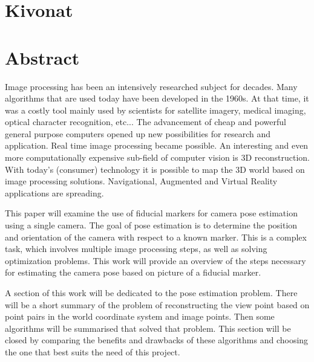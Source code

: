 \chapter*{Kivonat}

\vfill

\chapter*{Abstract}
Image processing has been an intensively researched subject for decades.
Many algorithms that are used today have been developed in the 1960s.
At that time, it was a costly tool mainly used by scientists for satellite imagery, medical imaging, optical character recognition, etc...
The advancement of cheap and powerful general purpose computers opened up new possibilities for research and application.
Real time image processing became possible.
An interesting and even more computationally expensive sub-field of computer vision is 3D reconstruction.
With today's (consumer) technology it is possible to map the 3D world based on image processing solutions.
Navigational, Augmented and Virtual Reality applications are spreading.

This paper will examine the use of fiducial markers for camera pose estimation using a single camera.
The goal of pose estimation is to determine the position and orientation of the camera with respect to a known marker.
This is a complex task, which involves multiple image processing steps, as well as solving optimization problems.
This work will provide an overview of the steps necessary for estimating the camera pose based on picture of a fiducial marker.

A section of this work will be dedicated to the pose estimation problem.
There will be a short summary of the problem of reconstructing the view point based on point pairs in the world coordinate system and image points.
Then some algorithms will be summarised that solved that problem.
This section will be closed by comparing the benefits and drawbacks of these algorithms and choosing the one that best suits the need of this project.

